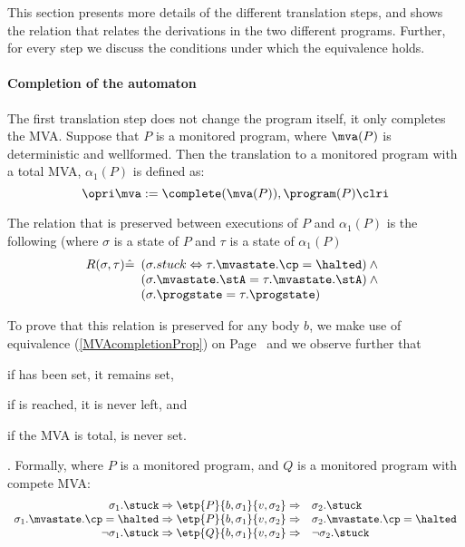 This section presents more details of the different translation steps,
and shows the relation that relates the derivations in the two
different programs. Further, for every step we discuss the conditions
under which the equivalence holds.



\paragraph{Completion of the automaton}
The first translation step does not change the program itself, it only
completes the MVA. Suppose that \(P\) is a monitored program, where
\(\mva(P)\) is deterministic and wellformed. Then the translation to a
monitored program with a total MVA, \(\alpha_1(P)\) is defined as:
\[
\opri \mva := \complete(\mva(P)), \program(P) \clri
\]

The relation that is preserved between executions of \(P\) and
\(\alpha_1(P)\) is the following (where \(\sigma\) is a state of
\(P\) and \(\tau\) is a state of \(\alpha_1(P)\)
\[R(\sigma, \tau) \hat=
 \begin{array}[t]{l}
  (\sigma.stuck \Leftrightarrow \tau.\mvastate.\cp = \halted) \:\wedge \\
  (\sigma.\mvastate.\stA = \tau.\mvastate.\stA) \:\wedge \\
  (\sigma.\progstate = \tau.\progstate)
\end{array}
\]

To prove that this relation is preserved for any body \(b\), we make
use of equivalence (\ref{MVAcompletionProp}) on
Page~\pageref{MVAcompletionProp} and we observe further that
\begin{inparaenum}
\item if \stuck has been set, it remains set,
\item if \halted is reached, it is never left, and
\item if the MVA is total, \stuck is never set.
\end{inparaenum}. Formally, where \(P\) is a monitored program, and
\(Q\) is a monitored program with compete MVA:
\[
\begin{array}[t]{rl}
\sigma_1.\stuck \Rightarrow
\etp{P}{b,\sigma_1}{v,\sigma_2} \Rightarrow &
\sigma_2.\stuck \\
\sigma_1.\mvastate.\cp = \halted \Rightarrow
\etp{P}{b,\sigma_1}{v,\sigma_2} \Rightarrow &
\sigma_2.\mvastate.\cp = \halted \\
\neg \sigma_1.\stuck \Rightarrow
\etp{Q}{b,\sigma_1}{v,\sigma_2} \Rightarrow &
\neg \sigma_2.\stuck
\end{array}
\]

